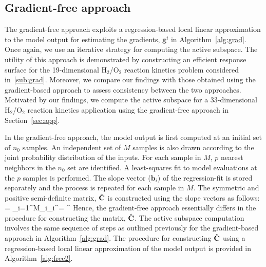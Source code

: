\subsection{Gradient-free approach}
\label{sub:gradfree}

The gradient-free approach exploits a regression-based local linear
approximation to the model output for estimating the gradients, $\bm{g}^i$
in Algorithm~\ref{alg:grad}. Once again, we use an iterative strategy for
computing the active subspace. The utility of this approach is demonstrated
by constructing an efficient response surface for the 19-dimensional 
H$_2$/O$_2$ reaction kinetics problem considered in~\ref{sub:grad}.
Moreover, we compare our findings with
those obtained using the gradient-based approach to assess consistency
between the two approaches. Motivated by our findings, we compute the active 
subspace for a 33-dimensional H$_2$/O$_2$ reaction kinetics application using the gradient-free
approach in Section~\ref{sec:app}. 

In the gradient-free approach, the model output is first computed at an initial set of $n_0$ samples. 
An independent set of $M$ samples is also drawn according to the joint probability distribution of the inputs.
For each sample in $M$, $p$ nearest neighbors in the $n_0$ set are identified. A least-squares fit to model
evaluations at the $p$ samples is performed. The slope vector ($\bm{b}_i$) of the regression-fit is stored
separately and the process is repeated for each sample in $M$. The symmetric and positive semi-definite matrix,
$\hat{\mathbf{{C}}}$ is constructed using the slope vectors as follows:
%
\be
{} = \sum\limits_{i=1}^{M}_i_i^\top = \hat{\bm{\Lambda}}^\top
\ee
%
Hence, the gradient-free approach essentially differs in the procedure for constructing the matrix, $\hat{\mathbf{{C}}}$.
The active subspace computation involves the same sequence of steps as outlined previously for the gradient-based 
approach in Algorithm~\ref{alg:grad}. The procedure for constructing $\hat{\mathbf{{C}}}$ using a regression-based
local linear approximation
of the model output is provided in Algorithm~\ref{alg:free2}.

